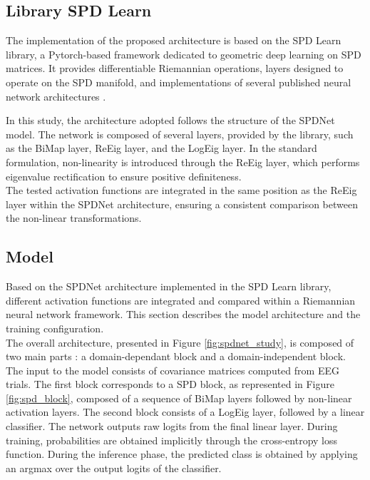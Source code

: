 \documentclass[11pt,a4paper]{article}
\begin{document}
\subsection{Library SPD Learn}
The implementation of the proposed architecture is based on the SPD Learn library, a Pytorch-based framework dedicated to geometric deep learning on SPD matrices. It provides differentiable Riemannian operations, layers designed to operate on the SPD manifold, and implementations of several published neural network architectures \cite{spdlearn}. 

\noindent In this study, the architecture adopted follows the structure of the SPDNet model. The network is composed of several layers, provided by the library, such as  the BiMap layer, ReEig layer, and the LogEig layer. In the standard formulation, non-linearity is introduced through the ReEig layer, which performs eigenvalue rectification to ensure positive definiteness.\\

\noindent The tested activation functions are integrated in the same position as the ReEig layer within the SPDNet architecture, ensuring a consistent comparison between the non-linear transformations. 

\subsection{Model}
\label{sec:model}
Based on the SPDNet architecture implemented in the SPD Learn library, different activation functions are integrated and compared within a Riemannian neural network framework. This section describes the model architecture and the training configuration. \\

\noindent The overall architecture, presented in Figure \ref{fig:spdnet_study}, is composed of two main parts :  a domain-dependant block and a domain-independent block. The input to the model consists of covariance matrices computed from EEG trials.
\noindent The first block corresponds to a SPD block, as represented in Figure \ref{fig:spd_block}, composed of a sequence of BiMap layers followed by non-linear activation layers.
\noindent The second block consists of a LogEig layer, followed by a linear classifier. The network outputs raw logits from the final linear layer. During training, probabilities are obtained implicitly through the cross-entropy loss function. During the inference phase, the predicted class is obtained by applying an argmax over the output logits of the classifier.
\end{document}
